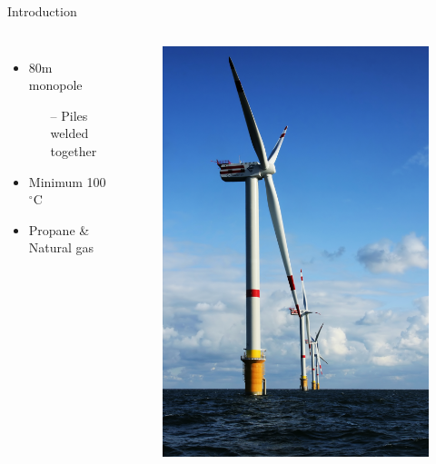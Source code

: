 \documentclass[11pt,aspectratio=43,mathserif]{beamer}
\begin{document}
\begin{frame}{Introduction}
  \begin{columns}[onlytextwidth]
      \begin{itemize}
        \item 80m monopole
        \begin{itemize}
       		\item[--] Piles welded together
	    \end{itemize}    
	    \pause    
        \item Minimum 100 $^{\circ} \text{C}$
        \pause
        \item Propane \& Natural gas
      \end{itemize}

		\begin{figure}[H]
			\hfill 
			\includegraphics[width=.9\linewidth]{figures/Windmill.png}
		\end{figure} 
  \end{columns}
\end{frame}
\end{document}

